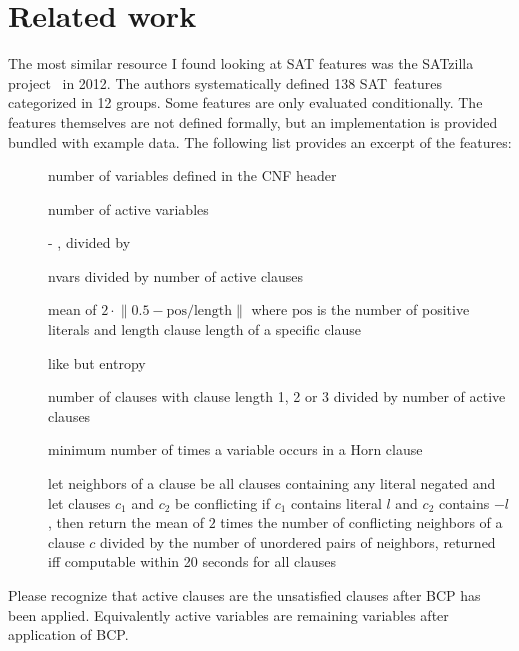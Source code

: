 \section{Related work}
\label{sec:features-related}
%
The most similar resource I found looking at SAT features was the
SATzilla project~\cite{satzilla2004,satzilla2008} in 2012. The authors systematically defined
138 SAT~features categorized in 12 groups. Some features are only evaluated conditionally.
The features themselves are not defined formally, but an implementation is provided bundled
with example data. The following list provides an excerpt of the features:

\begin{description}
\item[] number of variables defined in the CNF header
\item[] number of active variables
\item[]  - , divided by 
\item[] nvars divided by number of active clauses
\item[] mean of $2 \cdot \left\| 0.5 - {\text{pos}}/{\text{length}}\right\|$ where $\text{pos}$ is the number of positive literals and $\text{length}$ clause length of a specific clause
\item[] like  but entropy
\item[] number of clauses with clause length 1, 2 or 3 divided by number of active clauses
\item[] minimum number of times a variable occurs in a Horn clause
\item[]
   let neighbors of a clause be all clauses containing any literal negated
   and let clauses $c_1$ and $c_2$ be conflicting if $c_1$ contains literal $l$ and $c_2$ contains $-l$,
   then return the mean of $2$ times the number of conflicting neighbors of a clause $c$
   divided by the number of unordered pairs of neighbors,
   returned iff computable within 20 seconds for all clauses
\end{description}

Please recognize that active clauses are the unsatisfied clauses after BCP has been applied.
Equivalently active variables are remaining variables after application of BCP.

